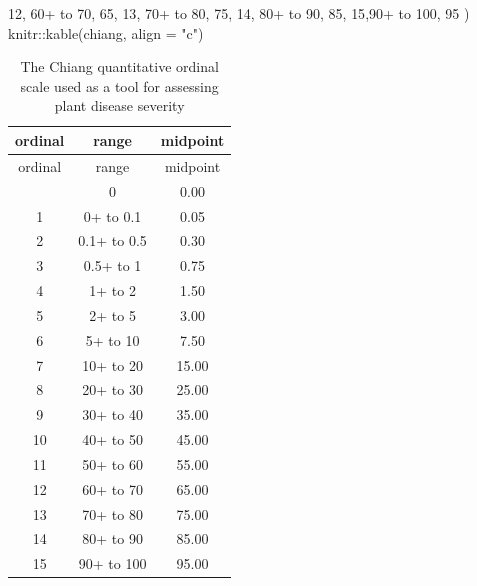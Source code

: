 \documentclass[
  letterpaper,
]{book}
\newenvironment{Shaded}{\begin{snugshade}}{\end{snugshade}}
\newcommand{\AttributeTok}[1]{\textcolor[rgb]{0.40,0.45,0.13}{#1}}
\newcommand{\DecValTok}[1]{\textcolor[rgb]{0.68,0.00,0.00}{#1}}
\newcommand{\FunctionTok}[1]{\textcolor[rgb]{0.28,0.35,0.67}{#1}}
\newcommand{\NormalTok}[1]{\textcolor[rgb]{0.00,0.23,0.31}{#1}}
\newcommand{\SpecialCharTok}[1]{\textcolor[rgb]{0.37,0.37,0.37}{#1}}
\newcommand{\StringTok}[1]{\textcolor[rgb]{0.13,0.47,0.30}{#1}}
\begin{document}
\begin{Shaded}
\begin{Highlighting}[]
  \DecValTok{12}\NormalTok{, }\StringTok{\textquotesingle{}60+ to 70\textquotesingle{}}\NormalTok{,    }\DecValTok{65}\NormalTok{,}
  \DecValTok{13}\NormalTok{, }\StringTok{\textquotesingle{}70+ to 80\textquotesingle{}}\NormalTok{,    }\DecValTok{75}\NormalTok{,}
  \DecValTok{14}\NormalTok{, }\StringTok{\textquotesingle{}80+ to 90\textquotesingle{}}\NormalTok{,    }\DecValTok{85}\NormalTok{,}
  \DecValTok{15}\NormalTok{,}\StringTok{\textquotesingle{}90+ to 100\textquotesingle{}}\NormalTok{,   }\DecValTok{95}
\NormalTok{  )}
\NormalTok{knitr}\SpecialCharTok{::}\FunctionTok{kable}\NormalTok{(chiang, }\AttributeTok{align =} \StringTok{"c"}\NormalTok{)}
\end{Highlighting}
\end{Shaded}

\hypertarget{tbl-chiang}{}
\begin{longtable}[]{@{}ccc@{}}
\caption{\label{tbl-chiang}The Chiang quantitative ordinal scale used as
a tool for assessing plant disease severity}\tabularnewline
\toprule\noalign{}
ordinal & range & midpoint \\
\midrule\noalign{}
\endfirsthead
\toprule\noalign{}
ordinal & range & midpoint \\
\midrule\noalign{}
\endhead
\bottomrule\noalign{}
\endlastfoot
0 & 0 & 0.00 \\
1 & 0+ to 0.1 & 0.05 \\
2 & 0.1+ to 0.5 & 0.30 \\
3 & 0.5+ to 1 & 0.75 \\
4 & 1+ to 2 & 1.50 \\
5 & 2+ to 5 & 3.00 \\
6 & 5+ to 10 & 7.50 \\
7 & 10+ to 20 & 15.00 \\
8 & 20+ to 30 & 25.00 \\
9 & 30+ to 40 & 35.00 \\
10 & 40+ to 50 & 45.00 \\
11 & 50+ to 60 & 55.00 \\
12 & 60+ to 70 & 65.00 \\
13 & 70+ to 80 & 75.00 \\
14 & 80+ to 90 & 85.00 \\
15 & 90+ to 100 & 95.00 \\
\end{longtable}
\end{document}
